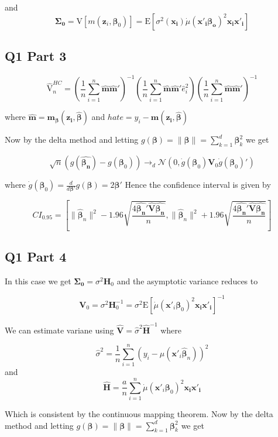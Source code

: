 \documentclass[11pt]{article}
\newcommand{\E}{\mathrm{E}}
\newcommand{\V}{\mathrm{V}}
\newcommand{\N}{\mathcal{N}}
\begin{document}
and 
$$
\bm{\Sigma_0} = \V[m(\bm{z}_i, \bm{\beta}_0)] = \E[\sigma^2(\bm{x_i}) \dot{\mu}(\bm{x'_i \beta_o})^2 \bm{x_ix'_i}]
$$


\subsection{Q1 Part 3}

$$\hat{\V}_n^{HC} = \left( \frac{1}{n} \sum_{i=1}^{n} \hat{\bm{m}} \hat{\bm{m}}'  \right)^{-1}  \left( \frac{1}{n} \sum_{i=1}^{n} \hat{\bm{m}} \hat{\bm{m}}' \hat{e}_i^2  \right) \left( \frac{1}{n} \sum_{i=1}^{n} \hat{\bm{m}} \hat{\bm{m}}'  \right)^{-1} 
$$

where $\hat{\bm{m}} = \bm{m_{\beta}(z_i, \hat{\beta})} $  and $ hat{e} = y_i -\bm{m(z_i, \hat{\beta})} $

 Now by the delta method and letting $g(\bm{\beta}) = \lVert \bm{\beta} \rVert = \sum_{k=1}^{d} \bm{\beta}_k^2
$ we get 

$$ \sqrt{n}(g(\hat{\bm{\beta_n}}) - g(\bm{\beta}_0)) \to_d \N (0, \dot{g}(\bm{\beta}_0) \bm{V}_0 \dot{g}(\bm{\beta}_0)')
$$

where $\dot{g}(\bm{\beta}_0) = \frac{d}{d\bm{\beta}'}g(\bm{\beta}) = 2 \bm{\beta}' $ Hence the confidence interval is given by 


$$ CI_{0.95} = \left[ \lVert \hat{\bm{\beta}}_n \rVert ^2 - 1.96 \sqrt{\frac{4\hat{\bm{\beta_n}}'\hat{\bm{V}} \hat{\bm{\beta_n}} }{n}},  \lVert \hat{\bm{\beta}}_n \rVert ^2 + 1.96 \sqrt{\frac{4\hat{\bm{\beta_n}}'\hat{\bm{V}} \hat{\bm{\beta_n}} }{n}} \right] 
$$


\subsection{Q1 Part 4}

In this case we get $\bm{\Sigma_0} = \sigma^2 \bm{H}_0$ and the asymptotic variance reduces to 

$$ \bm{V}_0 = \sigma^2 \bm{H}_0 ^{-1} = \sigma^2 \E[ \dot{\mu}(\bm{x}'_i \bm{\beta}_0)^2\bm{x_ix'_i} ]^{-1} $$

We can estimate variane using $\hat{\bm{V}} = \hat{\sigma}^2 \hat{\bm{H}}^{-1}$ where 

$$ \hat{\sigma}^2 = \frac{1}{n} \sum_{i=1}^{n}(y_i - \mu(\bm{x}'_i \hat{\bm{\beta}}_n))^2
$$
and 
$$ \hat{\bm{H}} = \frac{a}{n} \sum_{i=1}^{n}\dot{\mu}(\bm{x}'_i \bm{\beta}_0)^2\bm{x_ix'_i}
$$

Which is consistent by the continuous mapping theorem. Now by the delta method and letting $g(\bm{\beta}) = \lVert \bm{\beta} \rVert = \sum_{k=1}^{d} \bm{\beta}_k^2
$ we get 
\end{document}
